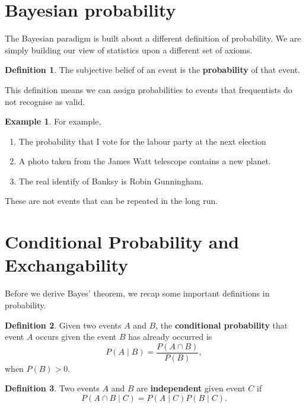 \documentclass[
]{book}
\theoremstyle{definition}
\newtheorem{definition}{Definition}[chapter]
\theoremstyle{definition}
\newtheorem{example}{Example}[chapter]
\theoremstyle{definition}
\theoremstyle{definition}
\theoremstyle{remark}
\begin{document}
\hypertarget{bayesian-probability}{%
\section{Bayesian probability}\label{bayesian-probability}}

The Bayesian paradigm is built about a different definition of probability. We are simply building our view of statistics upon a different set of axioms.

\begin{definition}
The subjective belief of an event is the \textbf{probability} of that event.
\end{definition}

This definition means we can assign probabilities to events that frequentists do not recognise as valid.

\begin{example}
For example,

\begin{enumerate}
\def\labelenumi{\arabic{enumi}.}
\item
  The probability that I vote for the labour party at the next election
\item
  A photo taken from the James Watt telescope contains a new planet.
\item
  The real identify of Banksy is Robin Gunningham.
\end{enumerate}

These are not events that can be repeated in the long run.
\end{example}

\hypertarget{conditional-probability-and-exchangability}{%
\section{Conditional Probability and Exchangability}\label{conditional-probability-and-exchangability}}

Before we derive Bayes' theorem, we recap some important definitions in probability.

\begin{definition}
Given two events \(A\) and \(B\), the \textbf{conditional probability} that event \(A\) occurs given the event \(B\) has already occurred is
\[
P(A \mid B) = \frac{P(A \cap B)}{P(B)}, 
\]
when \(P(B) > 0\).
\end{definition}

\begin{definition}
Two events \(A\) and \(B\) are \textbf{independent} given event \(C\) if
\[ P(A \cap B \mid C) = P(A \mid C)P(B \mid C).\]
\end{definition}
\end{document}
